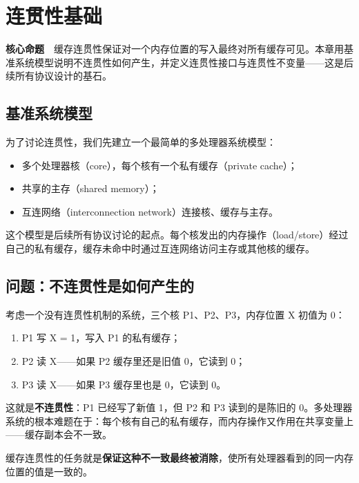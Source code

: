 \chapter{连贯性基础}

\begin{epigraph}
\textbf{核心命题}　缓存连贯性保证对一个内存位置的写入最终对所有缓存可见。本章用基准系统模型说明不连贯性如何产生，并定义连贯性接口与连贯性不变量——这是后续所有协议设计的基石。
\end{epigraph}



\section{基准系统模型}

为了讨论连贯性，我们先建立一个最简单的多处理器系统模型：

\begin{itemize}
\item 多个处理器核（core），每个核有一个私有缓存（private cache）；
\item 共享的主存（shared memory）；
\item 互连网络（interconnection network）连接核、缓存与主存。
\end{itemize}


这个模型是后续所有协议讨论的起点。每个核发出的内存操作（load/store）经过自己的私有缓存，缓存未命中时通过互连网络访问主存或其他核的缓存。

\section{问题：不连贯性是如何产生的}

考虑一个没有连贯性机制的系统，三个核 P1、P2、P3，内存位置 X 初值为 0：

\begin{enumerate}
\item P1 写 X = 1，写入 P1 的私有缓存；
\item P2 读 X——如果 P2 缓存里还是旧值 0，它读到 0；
\item P3 读 X——如果 P3 缓存里也是 0，它读到 0。
\end{enumerate}


这就是\textbf{不连贯性}：P1 已经写了新值 1，但 P2 和 P3 读到的是陈旧的 0。多处理器系统的根本难题在于：每个核有自己的私有缓存，而内存操作又作用在共享变量上——缓存副本会不一致。

缓存连贯性的任务就是\textbf{保证这种不一致最终被消除}，使所有处理器看到的同一内存位置的值是一致的。

